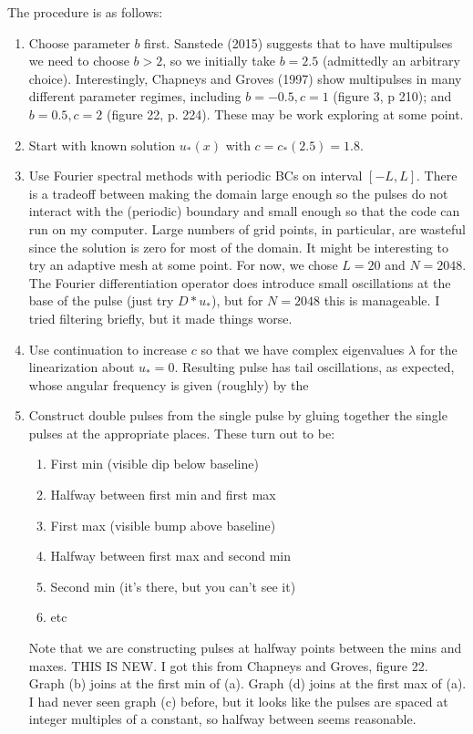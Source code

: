 \documentclass[12pt]{article}
\begin{document}
The procedure is as follows:
\begin{enumerate}
	\item Choose parameter $b$ first. Sanstede (2015) suggests that to have multipulses we need to choose $b > 2$, so we initially take $b = 2.5$ (admittedly an arbitrary choice). Interestingly, Chapneys and Groves (1997) show multipulses in many different parameter regimes, including $b = -0.5, c = 1$ (figure 3, p 210); and $b = 0.5, c = 2$ (figure 22, p. 224). These may be work exploring at some point.
	\item Start with known solution $u_*(x)$ with $c = c_*(2.5) = 1.8$.
	\item Use Fourier spectral methods with periodic BCs on interval $[-L, L]$. There is a tradeoff between making the domain large enough so the pulses do not interact with the (periodic) boundary and small enough so that the code can run on my computer. Large numbers of grid points, in particular, are wasteful since the solution is zero for most of the domain. It might be interesting to try an adaptive mesh at some point. For now, we chose $L = 20$ and $N = 2048$. The Fourier differentiation operator does introduce small oscillations at the base of the pulse (just try $D*u_*$), but for $N = 2048$ this is manageable. I tried filtering briefly, but it made things worse.
	\item Use continuation to increase $c$ so that we have complex eigenvalues $\lambda$ for the linearization about $u_* = 0$. Resulting pulse has tail oscillations, as expected, whose angular frequency is given (roughly) by the 
	\item Construct double pulses from the single pulse by gluing together the single pulses at the appropriate places. These turn out to be:
		\begin{enumerate}
			\item First min (visible dip below baseline)
			\item Halfway between first min and first max
			\item First max (visible bump above baseline)
			\item Halfway between first max and second min
			\item Second min (it's there, but you can't see it)
			\item etc
		\end{enumerate}
	Note that we are constructing pulses at halfway points between the mins and maxes. THIS IS NEW. I got this from Chapneys and Groves, figure 22. Graph (b) joins at the first min of (a). Graph (d) joins at the first max of (a). I had never seen graph (c) before, but it looks like the pulses are spaced at integer multiples of a constant, so halfway between seems reasonable.
\end{enumerate}
\end{document}
